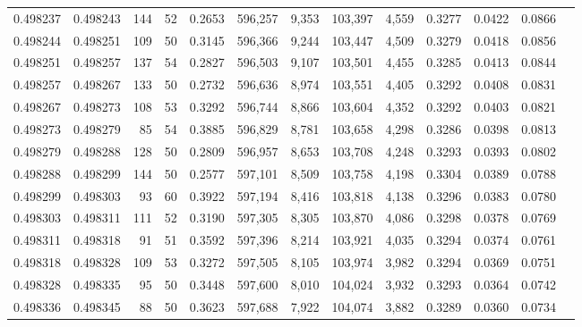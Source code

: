 \begin{tabular}{rrrrrrrrrrrrr}
0.498237 & 0.498243 &   144 &  52 &                                     0.2653 & 596,257 &   9,353 & 103,397 &   4,559 & 0.3277 & 0.0422 & 0.0866 \\
0.498244 & 0.498251 &   109 &  50 &                                     0.3145 & 596,366 &   9,244 & 103,447 &   4,509 & 0.3279 & 0.0418 & 0.0856 \\
0.498251 & 0.498257 &   137 &  54 &                                     0.2827 & 596,503 &   9,107 & 103,501 &   4,455 & 0.3285 & 0.0413 & 0.0844 \\
0.498257 & 0.498267 &   133 &  50 &                                     0.2732 & 596,636 &   8,974 & 103,551 &   4,405 & 0.3292 & 0.0408 & 0.0831 \\
0.498267 & 0.498273 &   108 &  53 &                                     0.3292 & 596,744 &   8,866 & 103,604 &   4,352 & 0.3292 & 0.0403 & 0.0821 \\
0.498273 & 0.498279 &    85 &  54 &                                     0.3885 & 596,829 &   8,781 & 103,658 &   4,298 & 0.3286 & 0.0398 & 0.0813 \\
0.498279 & 0.498288 &   128 &  50 &                                     0.2809 & 596,957 &   8,653 & 103,708 &   4,248 & 0.3293 & 0.0393 & 0.0802 \\
0.498288 & 0.498299 &   144 &  50 &                                     0.2577 & 597,101 &   8,509 & 103,758 &   4,198 & 0.3304 & 0.0389 & 0.0788 \\
0.498299 & 0.498303 &    93 &  60 &                                     0.3922 & 597,194 &   8,416 & 103,818 &   4,138 & 0.3296 & 0.0383 & 0.0780 \\
0.498303 & 0.498311 &   111 &  52 &                                     0.3190 & 597,305 &   8,305 & 103,870 &   4,086 & 0.3298 & 0.0378 & 0.0769 \\
0.498311 & 0.498318 &    91 &  51 &                                     0.3592 & 597,396 &   8,214 & 103,921 &   4,035 & 0.3294 & 0.0374 & 0.0761 \\
0.498318 & 0.498328 &   109 &  53 &                                     0.3272 & 597,505 &   8,105 & 103,974 &   3,982 & 0.3294 & 0.0369 & 0.0751 \\
0.498328 & 0.498335 &    95 &  50 &                                     0.3448 & 597,600 &   8,010 & 104,024 &   3,932 & 0.3293 & 0.0364 & 0.0742 \\
0.498336 & 0.498345 &    88 &  50 &                                     0.3623 & 597,688 &   7,922 & 104,074 &   3,882 & 0.3289 & 0.0360 & 0.0734 \\

\end{tabular}
